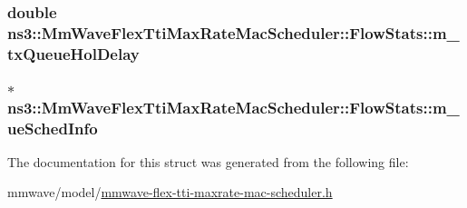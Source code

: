 \subsubsection[{\texorpdfstring{m\+\_\+tx\+Queue\+Hol\+Delay}{m_txQueueHolDelay}}]{\setlength{\rightskip}{0pt plus 5cm}double ns3\+::\+Mm\+Wave\+Flex\+Tti\+Max\+Rate\+Mac\+Scheduler\+::\+Flow\+Stats\+::m\+\_\+tx\+Queue\+Hol\+Delay}\hypertarget{structns3_1_1MmWaveFlexTtiMaxRateMacScheduler_1_1FlowStats_a621a02631e23b5214b05f13320593e7b}{}\label{structns3_1_1MmWaveFlexTtiMaxRateMacScheduler_1_1FlowStats_a621a02631e23b5214b05f13320593e7b}
\subsubsection[{\texorpdfstring{m\+\_\+ue\+Sched\+Info}{m_ueSchedInfo}}]{$\ast$ ns3\+::\+Mm\+Wave\+Flex\+Tti\+Max\+Rate\+Mac\+Scheduler\+::\+Flow\+Stats\+::m\+\_\+ue\+Sched\+Info}\hypertarget{structns3_1_1MmWaveFlexTtiMaxRateMacScheduler_1_1FlowStats_a45a65d0fb7b6d2a266714183d31e0017}{}\label{structns3_1_1MmWaveFlexTtiMaxRateMacScheduler_1_1FlowStats_a45a65d0fb7b6d2a266714183d31e0017}


The documentation for this struct was generated from the following file\+:\begin{DoxyCompactItemize}
\item 
mmwave/model/\hyperlink{mmwave-flex-tti-maxrate-mac-scheduler_8h}{mmwave-\/flex-\/tti-\/maxrate-\/mac-\/scheduler.\+h}\end{DoxyCompactItemize}
